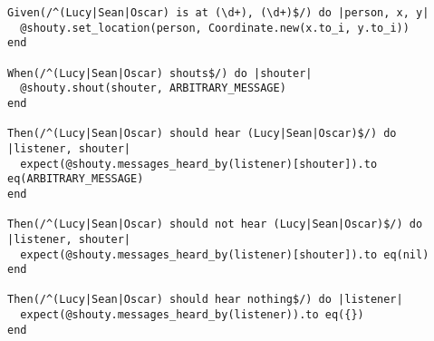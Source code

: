 \begin{verbatim}
Given(/^(Lucy|Sean|Oscar) is at (\d+), (\d+)$/) do |person, x, y|
  @shouty.set_location(person, Coordinate.new(x.to_i, y.to_i))
end

When(/^(Lucy|Sean|Oscar) shouts$/) do |shouter|
  @shouty.shout(shouter, ARBITRARY_MESSAGE)
end

Then(/^(Lucy|Sean|Oscar) should hear (Lucy|Sean|Oscar)$/) do |listener, shouter|
  expect(@shouty.messages_heard_by(listener)[shouter]).to eq(ARBITRARY_MESSAGE)
end

Then(/^(Lucy|Sean|Oscar) should not hear (Lucy|Sean|Oscar)$/) do |listener, shouter|
  expect(@shouty.messages_heard_by(listener)[shouter]).to eq(nil)
end

Then(/^(Lucy|Sean|Oscar) should hear nothing$/) do |listener|
  expect(@shouty.messages_heard_by(listener)).to eq({})
end
\end{verbatim}